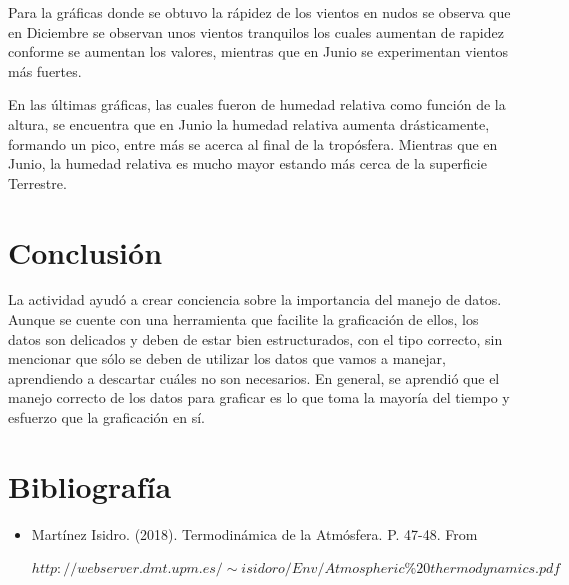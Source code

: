 \documentclass{article}
\begin{document}
    Para la gráficas donde se obtuvo la rápidez de los vientos en nudos se observa que en Diciembre se observan unos vientos tranquilos los cuales aumentan de rapidez conforme se aumentan los valores, mientras que en Junio se experimentan vientos más fuertes.
    
    En las últimas gráficas, las cuales fueron de humedad relativa como función de la altura, se encuentra que en Junio la humedad relativa aumenta drásticamente, formando un pico, entre más se acerca al final de la tropósfera. Mientras que en Junio, la humedad relativa es mucho mayor estando más cerca de la superficie Terrestre.

\section{Conclusión}
La actividad ayudó a crear conciencia sobre la importancia del manejo de datos. Aunque se cuente con una herramienta que facilite la graficación de ellos, los datos son delicados y deben de estar bien estructurados, con el tipo correcto, sin mencionar que sólo se deben de utilizar los datos que vamos a manejar, aprendiendo a descartar cuáles no son necesarios. En general, se aprendió que el manejo correcto de los datos para graficar es lo que toma la mayoría del tiempo y esfuerzo que la graficación en sí.

	
\section{Bibliografía}
\begin{itemize}
\item Martínez Isidro. (2018). Termodinámica de la Atmósfera. P. 47-48. From

$http://webserver.dmt.upm.es/\sim isidoro/Env/Atmospheric\%20thermodynamics.pdf$
\end{itemize}
\end{document}

